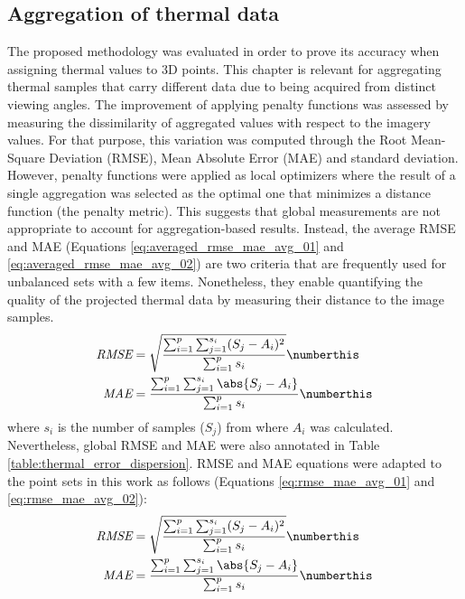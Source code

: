 \subsection{Aggregation of thermal data}

The proposed methodology was evaluated in order to prove its accuracy when assigning thermal values to 3D points. This chapter is relevant for aggregating thermal samples that carry different data due to being acquired from distinct viewing angles. The improvement of applying penalty functions was assessed by measuring the dissimilarity of aggregated values with respect to the imagery values. For that purpose, this variation was computed through the Root Mean-Square Deviation (RMSE), Mean Absolute Error (MAE) and standard deviation. However, penalty functions were applied as local optimizers where the result of a single aggregation was selected as the optimal one that minimizes a distance function (the penalty metric). This suggests that global measurements are not appropriate to account for aggregation-based results. Instead, the average RMSE and MAE (Equations \ref{eq:averaged_rmse_mae_avg_01} and \ref{eq:averaged_rmse_mae_avg_02}) are two criteria that are frequently used for unbalanced sets with a few items. Nonetheless, they enable quantifying the quality of the projected thermal data by measuring their distance to the image samples.
\begin{align*}
    \textit{RMSE} &= \sqrt{\frac{\sum_{i=1}^{p} \sum_{j=1}^{s_i} (S_j - A_i)^2}{\sum_{i=1}^{p} s_i}}     
    \numberthis \label{eq:averaged_rmse_mae_avg_01}\\
    \textit{MAE} &= \frac{\sum_{i=1}^{p} \sum_{j=1}^{s_i} \abs{S_j - A_i}}{\sum_{i=1}^{p} s_i} 
    \numberthis \label{eq:averaged_rmse_mae_avg_02}
\end{align*}
where $s_i$ is the number of samples ($S_j$) from where $A_i$ was calculated. Nevertheless, global RMSE and MAE were also annotated in Table \ref{table:thermal_error_dispersion}. RMSE and MAE equations were adapted to the point sets in this work as follows (Equations \ref{eq:rmse_mae_avg_01} and \ref{eq:rmse_mae_avg_02}):
\begin{align*}
    \textit{RMSE} &= \sqrt{\frac{\sum_{i=1}^{p} \sum_{j=1}^{s_i} (S_j - A_i)^2}{\sum_{i=1}^{p} s_i}}
    \numberthis \label{eq:rmse_mae_avg_01}\\
    \textit{MAE} &= \frac{\sum_{i=1}^{p} \sum_{j=1}^{s_i} \abs{S_j - A_i}}{\sum_{i=1}^{p} s_i}
    \numberthis \label{eq:rmse_mae_avg_02}
\end{align*}

